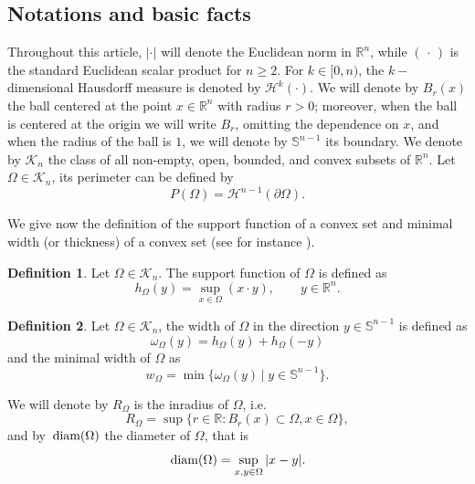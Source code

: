 \documentclass[oneside,a4paper,11pt,notitlepage]{article}
\makeatletter
\theoremstyle{definition}
\newtheorem{definizione}{Definition}[section]
\theoremstyle{plain}
\theoremstyle{definition}
\DeclareMathOperator{\diam}{\, \textup{diam}}
\newcommand{\Addresses}{{%
  \bigskip 
   \footnotesize 
 \noindent \textit{E-mail address}, V.~ Amato: \texttt{v.amato@ssmeridionale.it} 
  
   \medskip 
 
  \noindent\textsc{Mathematical and Physical Sciences for Advanced Materials and Technologies, Scuola Superiore Meridionale, Largo San Marcellino 10, 80138 Napoli, Italy. } 
 
 
 \medskip 
 

 \noindent  \textit{E-mail address}, N.~Gavitone: \texttt{nunzia.gavitone@unina.it} 
   
 \medskip
\noindent  \textsc{Dipartimento di Matematica e Applicazioni ``R. Caccioppoli'', Universit\`a degli studi di Napoli Federico II, Via Cintia, Complesso Universitario Monte S. Angelo, 80126 Napoli, Italy.}
  \medskip
 
 \noindent \textit{E-mail address}, R.~Sannipoli: \texttt{rossano.sannipoli@fjfi.cvut.cz} 
  
     \medskip 
\noindent\textsc{Department of Mathematics, Faculty of Nuclear Sciences and Physical Engineering, Czech Technical University in Prague, Trojanova 13, 120 00, Prague, Czech Republic.}


\par\nopagebreak 

}}
\makeatother
\begin{document}
\subsection{Notations and basic facts} 
 Throughout this article, $|\cdot|$ will denote the Euclidean norm in $\mathbb{R}^n$,
 while $(\,\cdot\,)$ is the standard Euclidean scalar product for  $n\geq2$. For $k\in [0,n)$, the $k-$dimensional Hausdorff measure is denoted by $\mathcal{H}^k(\cdot)$. We will denote by $B_r(x)$ the ball centered at the point $x\in \mathbb R^n$ with radius $r>0$; moreover, when the ball is centered at the origin we will write $B_r$, omitting the dependence on $x$, and when the radius of the ball is $1$, we will denote by $\mathbb{S}^{n-1}$ its boundary.  We denote by $\mathcal{K}_n$ the class of all non-empty, open, bounded, and convex subsets of $\mathbb{R}^n$. Let $\Omega \in \mathcal{K}_n$, its perimeter can be defined by
\[
P(\Omega) = \mathcal{H}^{n-1}(\partial \Omega).
\]

 
 We give now the definition of the support function of a convex set and minimal width (or thickness) of a convex set (see for instance \cite{schneider}).
\begin{definizione}\label{support}
  Let $\Omega\in \mathcal{K}_n$. The support function of $\Omega$ is defined as
  \begin{equation*}
    h_\Omega(y)=\sup_{x\in \Omega}\left(x\cdot y\right), \qquad y\in \mathbb{R}^n .
  \end{equation*}
\end{definizione}
 

\begin{definizione}
Let $\Omega\in \mathcal{K}_n$, the width of $\Omega$ in the direction $y \in \mathbb{S}^{n-1}$ is defined as 
  \begin{equation*}
    \omega_{\Omega}(y)=h_{\Omega}(y)+h_{\Omega}(-y)
    \end{equation*}
 and the minimal width of $\Omega$ as
\begin{equation*}
    w_\Omega=\min\{  \omega_{\Omega}(y)\,|\; y\in\mathbb{S}^{n-1}\}.
\end{equation*}
\end{definizione}
We will denote by $R_\Omega$ is the inradius of $\Omega$, i.e.
 \begin{equation}
     \label{inradiuss}
     R_\Omega=\sup\{r\in \mathbb R: B_r(x)\subset \Omega, x\in \Omega\},
 \end{equation}
and by $\diam(\Omega)$ the diameter of $\Omega$, that is
\begin{equation*}
    \diam(\Omega) = \sup_{x,y\in\Omega}|x-y|.
\end{equation*}
\end{document}
